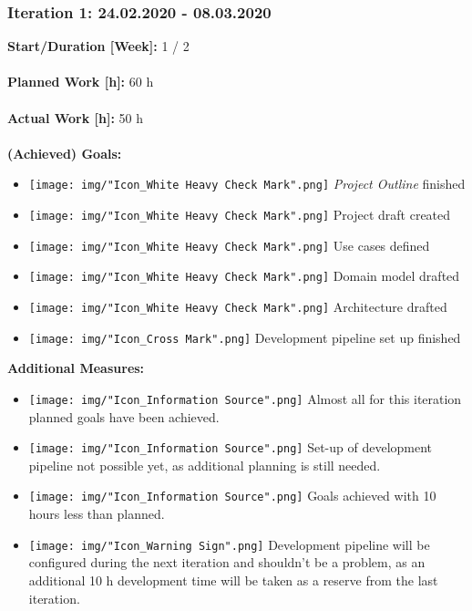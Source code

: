 			\subsubsection{Iteration 1: 24.02.2020 - 08.03.2020}
				\textbf{Start/Duration [Week]:} 1 / 2 \\~\\
				\textbf{Planned Work [h]:} 60 h \\~\\
				\textbf{Actual Work [h]:} 50 h \\~\\
				\textbf{(Achieved) Goals:}
				\begin{itemize}
					\item \texttt{[image: img/"Icon\_White Heavy Check Mark".png]} \textit{Project Outline} finished
					\item \texttt{[image: img/"Icon\_White Heavy Check Mark".png]} Project draft created 
					\item \texttt{[image: img/"Icon\_White Heavy Check Mark".png]} Use cases defined
					\item \texttt{[image: img/"Icon\_White Heavy Check Mark".png]} Domain model drafted
					\item \texttt{[image: img/"Icon\_White Heavy Check Mark".png]} Architecture drafted
					\item \texttt{[image: img/"Icon\_Cross Mark".png]} Development pipeline set up finished
				\end{itemize}
				\textbf{Additional Measures:}
				\begin{itemize}
					\item \texttt{[image: img/"Icon\_Information Source".png]} Almost all for this iteration planned goals have been achieved.
					\item \texttt{[image: img/"Icon\_Information Source".png]} Set-up of development pipeline not possible yet, as additional planning is still needed.
					\item \texttt{[image: img/"Icon\_Information Source".png]} Goals achieved with 10 hours less than planned.
					\item \texttt{[image: img/"Icon\_Warning Sign".png]} Development pipeline will be configured during the next iteration and shouldn't be a problem, as an additional 10 h development time will be taken as a reserve from the last iteration.
				\end{itemize}
				